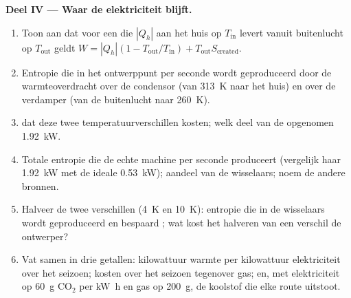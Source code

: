\begin{problem}
\medskip
\noindent\textbf{Deel IV --- Waar de elektriciteit blijft.}
\begin{enumerate}[resume]
  \item Toon aan dat voor een  die $|Q_h|$ aan het huis op
        $T_{\mathrm{in}}$ levert vanuit buitenlucht op $T_{\mathrm{out}}$ geldt
        $W = |Q_h|(1 - T_{\mathrm{out}}/T_{\mathrm{in}}) + T_{\mathrm{out}}S_{\mathrm{created}}$.
  \item Entropie die in het ontwerppunt per seconde wordt geproduceerd door de warmteoverdracht
        over de condensor (van \qty{313}{K} naar het huis) en
        over de verdamper (van de buitenlucht naar \qty{260}{K}).
  \item {} dat deze twee temperatuurverschillen kosten; welk deel van
        de opgenomen \qty{1.92}{kW}.
  \item Totale entropie die de echte machine per seconde produceert (vergelijk
        haar \qty{1.92}{kW} met de ideale \qty{0.53}{kW}); aandeel van de
        wisselaars; noem de andere bronnen.
  \item Halveer de twee verschillen (\qty{4}{K} en \qty{10}{K}): entropie die
        in de wisselaars wordt geproduceerd en bespaard ; wat kost het halveren
        van een verschil de ontwerper?
  \item Vat samen in drie getallen: kilowattuur warmte per
        kilowattuur elektriciteit over het seizoen; kosten over het seizoen
        tegenover gas; en, met elektriciteit op \qty{60}{g} CO$_2$ per
        \unit{kW h} en gas op \qty{200}{g}, de koolstof die elke
        route uitstoot.
\end{enumerate}
\end{problem}
